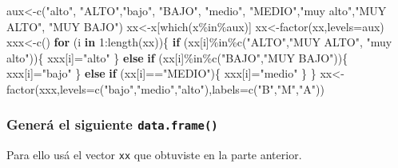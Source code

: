 \documentclass[
]{article}
\newenvironment{Shaded}{\begin{snugshade}}{\end{snugshade}}
\newcommand{\AttributeTok}[1]{\textcolor[rgb]{0.77,0.63,0.00}{#1}}
\newcommand{\ControlFlowTok}[1]{\textcolor[rgb]{0.13,0.29,0.53}{\textbf{#1}}}
\newcommand{\DecValTok}[1]{\textcolor[rgb]{0.00,0.00,0.81}{#1}}
\newcommand{\FunctionTok}[1]{\textcolor[rgb]{0.00,0.00,0.00}{#1}}
\newcommand{\NormalTok}[1]{#1}
\newcommand{\OtherTok}[1]{\textcolor[rgb]{0.56,0.35,0.01}{#1}}
\newcommand{\SpecialCharTok}[1]{\textcolor[rgb]{0.00,0.00,0.00}{#1}}
\newcommand{\StringTok}[1]{\textcolor[rgb]{0.31,0.60,0.02}{#1}}
\begin{document}
\begin{Shaded}
\begin{Highlighting}[]
\NormalTok{aux}\OtherTok{\textless{}{-}}\FunctionTok{c}\NormalTok{(}\StringTok{"alto"}\NormalTok{, }\StringTok{"ALTO"}\NormalTok{,}\StringTok{"bajo"}\NormalTok{, }\StringTok{"BAJO"}\NormalTok{, }\StringTok{"medio"}\NormalTok{, }\StringTok{"MEDIO"}\NormalTok{,}\StringTok{"muy alto"}\NormalTok{,}\StringTok{"MUY ALTO"}\NormalTok{, }\StringTok{"MUY BAJO"}\NormalTok{)}
\NormalTok{xx}\OtherTok{\textless{}{-}}\NormalTok{x[}\FunctionTok{which}\NormalTok{(x}\SpecialCharTok{\%in\%}\NormalTok{aux)]}
\NormalTok{xx}\OtherTok{\textless{}{-}}\FunctionTok{factor}\NormalTok{(xx,}\AttributeTok{levels=}\NormalTok{aux)}
\NormalTok{xxx}\OtherTok{\textless{}{-}}\FunctionTok{c}\NormalTok{()}
\ControlFlowTok{for}\NormalTok{ (i }\ControlFlowTok{in} \DecValTok{1}\SpecialCharTok{:}\FunctionTok{length}\NormalTok{(xx))\{}
  \ControlFlowTok{if}\NormalTok{ (xx[i]}\SpecialCharTok{\%in\%}\FunctionTok{c}\NormalTok{(}\StringTok{"ALTO"}\NormalTok{,}\StringTok{"MUY ALTO"}\NormalTok{, }\StringTok{"muy alto"}\NormalTok{))\{}
\NormalTok{    xxx[i]}\OtherTok{=}\StringTok{"alto"}
\NormalTok{  \} }\ControlFlowTok{else} \ControlFlowTok{if}\NormalTok{ (xx[i]}\SpecialCharTok{\%in\%}\FunctionTok{c}\NormalTok{(}\StringTok{"BAJO"}\NormalTok{,}\StringTok{"MUY BAJO"}\NormalTok{))\{}
\NormalTok{    xxx[i]}\OtherTok{=}\StringTok{"bajo"}
\NormalTok{  \} }\ControlFlowTok{else} \ControlFlowTok{if}\NormalTok{ (xx[i]}\SpecialCharTok{==}\StringTok{"MEDIO"}\NormalTok{)\{}
\NormalTok{    xxx[i]}\OtherTok{=}\StringTok{"medio"}
\NormalTok{  \} }
\NormalTok{\}}
\NormalTok{xx}\OtherTok{\textless{}{-}}\FunctionTok{factor}\NormalTok{(xxx,}\AttributeTok{levels=}\FunctionTok{c}\NormalTok{(}\StringTok{"bajo"}\NormalTok{,}\StringTok{"medio"}\NormalTok{,}\StringTok{"alto"}\NormalTok{),}\AttributeTok{labels=}\FunctionTok{c}\NormalTok{(}\StringTok{"B"}\NormalTok{,}\StringTok{"M"}\NormalTok{,}\StringTok{"A"}\NormalTok{))}
\end{Highlighting}
\end{Shaded}

\hypertarget{generuxe1-el-siguiente-data.frame}{%
\subsubsection{\texorpdfstring{Generá el siguiente
\texttt{data.frame()}}{Generá el siguiente data.frame()}}\label{generuxe1-el-siguiente-data.frame}}

Para ello usá el vector \texttt{xx} que obtuviste en la parte anterior.
\end{document}
